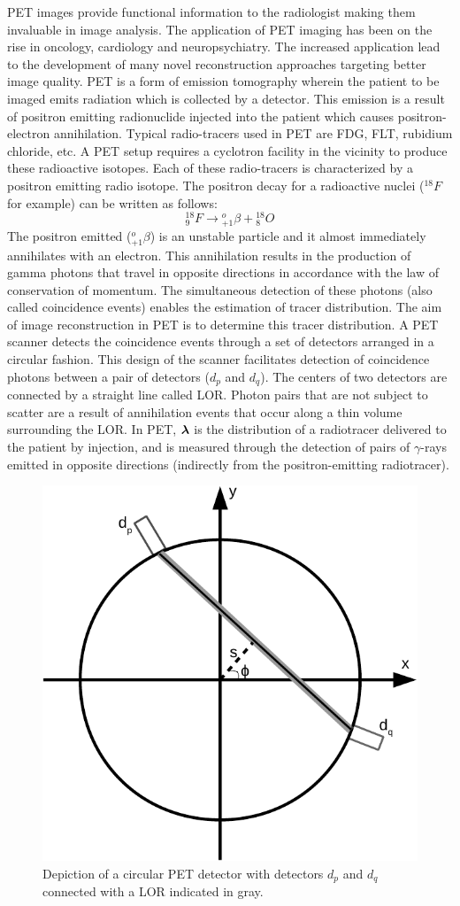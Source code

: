 \ac{PET} images provide functional information to the radiologist making them invaluable in image analysis. The application of \ac{PET} imaging has been on the rise in oncology, cardiology and neuropsychiatry. The increased application lead to the development of many novel reconstruction approaches targeting better image quality. \ac{PET} is a form of emission tomography wherein the patient to be imaged emits radiation which is collected by a detector. This emission is a result of positron emitting radionuclide injected into the patient which causes positron-electron annihilation. Typical radio-tracers used in \ac{PET} are \ac{FDG}, \ac{FLT}, rubidium chloride, etc. A \ac{PET} setup requires a cyclotron facility in the vicinity to produce these radioactive isotopes. Each of these radio-tracers is characterized by a positron emitting radio isotope. The positron decay for a radioactive nuclei (${ }_{}^{18} F$ for example) can be written as follows:
$$
{ }_{9}^{18} F \rightarrow{ }_{+1}^{o} \beta+{ }_{8}^{18} O
$$
The positron emitted (${ }_{+1}^{o} \beta$) is an unstable particle and it almost immediately annihilates with an electron. This annihilation results in the production of gamma photons that travel in opposite directions in accordance with the law of conservation of momentum. The simultaneous detection of these photons (also called coincidence events) enables the estimation of tracer distribution. The aim of image reconstruction in \ac{PET} is to determine this tracer distribution. A \ac{PET} scanner detects the coincidence events through a set of detectors arranged in a circular fashion. This design of the scanner facilitates detection of coincidence photons between a pair of detectors ($d_p$ and $d_q$). The centers of two detectors are connected by a straight line called \ac{LOR}. Photon pairs that are not subject to scatter are a result of annihilation events that occur along a thin volume surrounding the \ac{LOR}. In \ac{PET}, $\bm{\lambda}$ is the distribution of a radiotracer delivered to the patient by injection, and is measured through the detection of pairs of $\gamma$-rays emitted in opposite directions (indirectly from the positron-emitting radiotracer). 

\begin{figure}[!htbp]
	\centering
	\includegraphics[width=0.6\linewidth]{./Figures/PET_det-crop.pdf}
	\caption{Depiction of a circular \ac{PET} detector with detectors $d_p$ and $d_q$ connected with a \ac{LOR} indicated in gray.}
	\label{fig:2dpet}
\end{figure}

